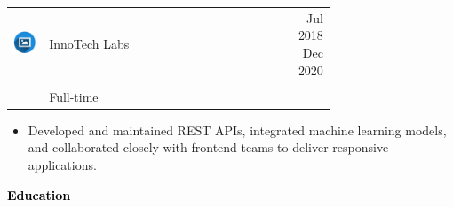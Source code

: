 \documentclass{article}
\begin{document}
\begin{paracol}{2}
\colorbox{maincolor}{%
  \begin{minipage}{\linewidth}
    \begin{tabular}{@{}lp{0.72\linewidth}r}
      \begin{minipage}{0.05\linewidth}
        \includegraphics[width=\linewidth]{picon.png}
      \end{minipage} & 
      {{InnoTech Labs}} &  
      {\footnotesize {{Jul 2018}} {{Dec 2020}} } \\[-10pt]
      & {\color{sidetext}{Software Engineer}} & \\
      & {\small {{Full-time}} } & \\
    \end{tabular}
\begin{itemize}
    \item {{Developed and maintained REST APIs, integrated machine learning models, and collaborated closely with frontend teams to deliver responsive applications.}}
\end{itemize}
  \end{minipage}%
}

\vspace{0.5cm}

\textcolor{black}{\Large \textbf{Education}} \\



\end{paracol}
\end{document}
